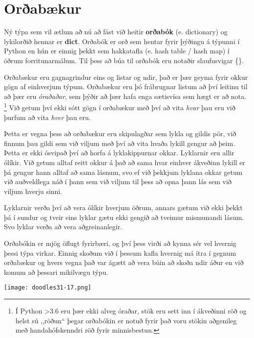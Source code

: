 
\chapter{Orðabækur}\label{k:orðabækur}
Ný týpa sem vil ætlum að nú að fást við heitir \textbf{orðabók} (e. dictionary)  og lykilorðið hennar er \textbf{dict}.
Orðabók er orð sem hentar fyrir þýðingu á týpunni í Python en hún er einnig þekkt sem hakkatafla (e. hash table / hash map) í öðrum forritunarmálum.
Til þess að búa til orðabók eru notaðir slaufusvigar \{\}.

Orðabækur eru gagnagrindur eins og listar og ndir, það er þær geyma fyrir okkur gögn af einhverjum týpum.
Orðabækur eru þó frábrugnar listum að því leitinu til að þær eru \textit{óraðaðar}, sem þýðir að þær hafa enga sætisvísa sem hægt er að nota.
\footnote{Í Python >3.6 eru þær ekki alveg óraðar, stök eru sett inn í ákveðinni röð og helst sú ,,röðun“ þegar orðabókin er notuð fyrir það voru stökin aðgenileg með handahófskenndri röð fyrir minnisbestun.}
Við getum því ekki sótt gögn í orðabækur með því að vita \textit{hvar} þau eru við þurfum að vita \textit{hver} þau eru.

Þetta er vegna þess að orðabækur eru skipulagðar sem lykla og gildis pör, við finnum þau gildi sem við viljum með því að vita hvaða lykill gengur að þeim.
Þetta er ekki ósvipað því að horfa á lyklakippurnar okkar.
Lyklarnir eru allir ólíkir.
Við getum alltaf reitt okkur á það að sama hvar einhver ákveðinn lykill er þá gengur hann alltaf að sama lásnum, svo ef við þekkjum lyklana okkar getum við auðveldlega náð í þann sem við viljum til þess að opna þann lás sem við viljum hverju sinni.

Lyklarnir verða því að vera ólíkir hverjum öðrum, annars gætum við ekki þekkt þá í sundur og tveir eins lyklar gætu ekki gengið að tveimur mismunandi lásum.
Svo lyklar verða að vera aðgreinanlegir.

Orðabókin er mjög öflugt fyrirbæri, og því þess virði að kynna sér vel hvernig þessi týpa virkar.
Einnig skoðum við í þessum kafla hvernig má ítra í gegnum orðabækur og hvers vegna það var ágætt að vera búin að skoða ndir áður en við komum að þessari mikilvægu týpu.

	\begin{center}
		\texttt{[image: doodles31-17.png]}
	\end{center}
